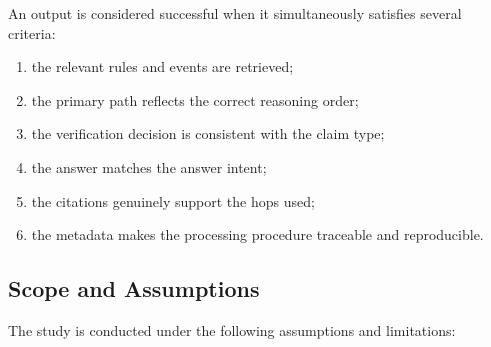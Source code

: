An output is considered successful when it simultaneously satisfies several
criteria:

\begin{enumerate}
    \item the relevant rules and events are retrieved;
    \item the primary path reflects the correct reasoning order;
    \item the verification decision is consistent with the claim type;
    \item the answer matches the answer intent;
    \item the citations genuinely support the hops used;
    \item the metadata makes the processing procedure traceable and
    reproducible.
\end{enumerate}

\subsection{Scope and Assumptions}

The study is conducted under the following assumptions and limitations:

